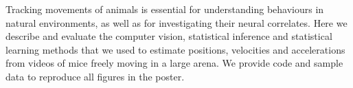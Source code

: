 Tracking movements of animals is essential for understanding behaviours in
natural environments, as well as for investigating their neural correlates.
%
Here we describe and evaluate the computer vision, statistical inference and
statistical learning methods that we used to estimate positions, velocities and
accelerations from videos of mice freely moving in a large arena.
%
We provide code and sample data to reproduce all figures in the poster.
